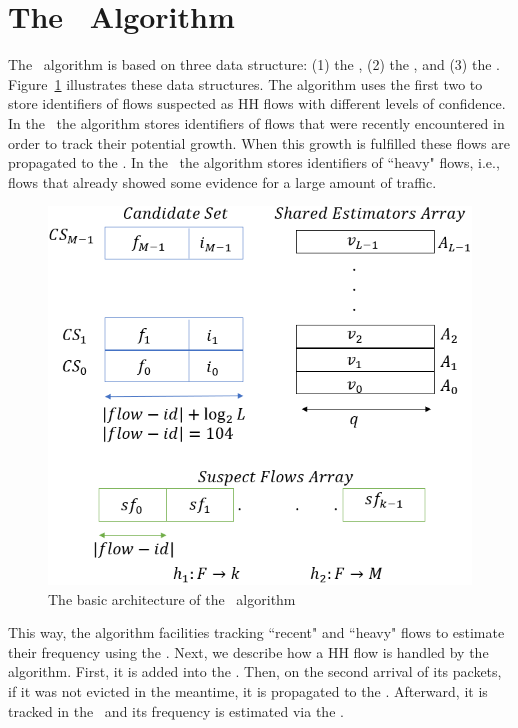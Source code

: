 \section{The \cs\ Algorithm}
\label{sec:architecture}
The \cs\ algorithm is based on three data structure: (1) the \textit{\sfa}, (2) the \textit{\cs}, and (3) the \textit{\sea}. Figure~\ref{fig:ds} illustrates these data structures.
The algorithm uses the first two to store identifiers of flows suspected as HH flows with different levels of confidence.
In the \sfa\ the algorithm stores identifiers of flows that were recently encountered in order to track their potential growth. When this growth is fulfilled these flows are propagated to the \cs. In the \cs\ the algorithm stores identifiers of ``heavy" flows, i.e., flows that already showed some evidence for a large amount of traffic.

\begin{figure}
  \centering
  \includegraphics[width=\linewidth]{HH/figures/ds.png}
  \caption{The basic architecture of the \cs\ algorithm}
  \label{fig:ds}
\end{figure}

This way, the algorithm facilities tracking ``recent" and ``heavy" flows to estimate their frequency using the \sea. Next, we describe how a HH flow is handled by the algorithm. First, it is added into the \sfa. Then, on the second arrival of its packets, if it was not evicted in the meantime, it is propagated to the \cs. Afterward, it is tracked in the \cs\ and its frequency is estimated via the \sea.

